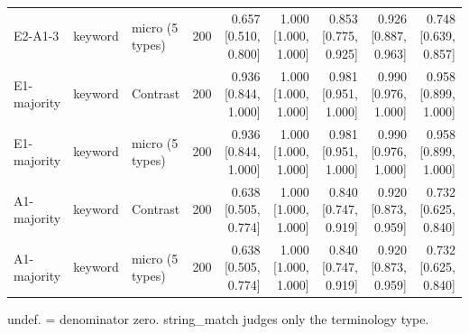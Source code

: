 \begin{table}[t]
\begin{tabular}{lllrrrrrr}
E2-A1-3 & keyword & micro (5 types) & 200 & 0.657 [0.510, 0.800] & 1.000 [1.000, 1.000] & 0.853 [0.775, 0.925] & 0.926 [0.887, 0.963] & 0.748 [0.639, 0.857] \\
E1-majority & keyword & Contrast & 200 & 0.936 [0.844, 1.000] & 1.000 [1.000, 1.000] & 0.981 [0.951, 1.000] & 0.990 [0.976, 1.000] & 0.958 [0.899, 1.000] \\
E1-majority & keyword & micro (5 types) & 200 & 0.936 [0.844, 1.000] & 1.000 [1.000, 1.000] & 0.981 [0.951, 1.000] & 0.990 [0.976, 1.000] & 0.958 [0.899, 1.000] \\
A1-majority & keyword & Contrast & 200 & 0.638 [0.505, 0.774] & 1.000 [1.000, 1.000] & 0.840 [0.747, 0.919] & 0.920 [0.873, 0.959] & 0.732 [0.625, 0.840] \\
A1-majority & keyword & micro (5 types) & 200 & 0.638 [0.505, 0.774] & 1.000 [1.000, 1.000] & 0.840 [0.747, 0.919] & 0.920 [0.873, 0.959] & 0.732 [0.625, 0.840] \\
\bottomrule
\end{tabular}
\par\footnotesize undef. = denominator zero. string\_match judges only the terminology type.
\end{table}
